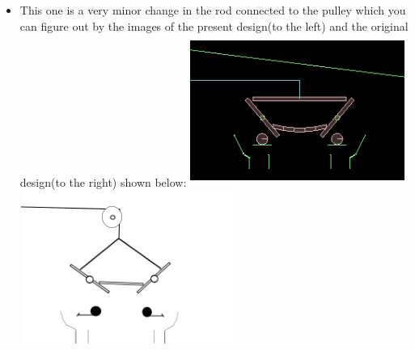\documentclass[english]{article}
\begin{document}
\begin{itemize}
\item This one is a very minor change in the rod connected to the pulley which you can figure out by the images of the present design(to the left) and the original design(to the right) shown below:
\newline
\includegraphics[width=7cm, height=5cm]{doc/change3.png}
\includegraphics[width=7cm, height=5cm]{doc/original3.png}
\newline
\end{itemize}
\end{document}
